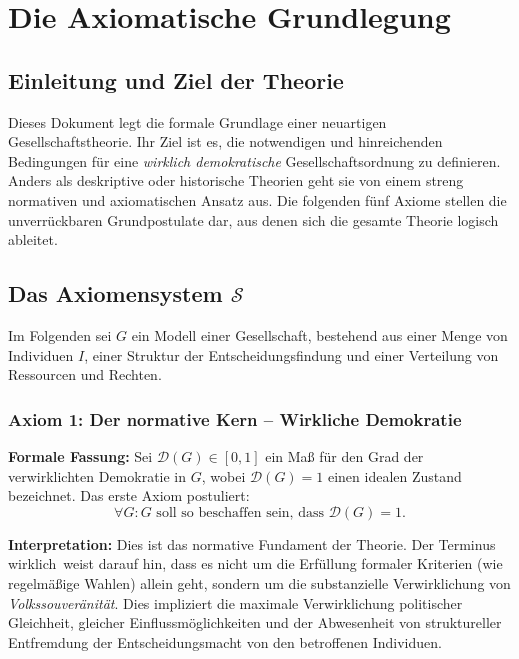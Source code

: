 
\chapter{Die Axiomatische Grundlegung}
\label{chap:axiome}

\section{Einleitung und Ziel der Theorie}
Dieses Dokument legt die formale Grundlage einer neuartigen Gesellschaftstheorie. Ihr Ziel ist es, die notwendigen und hinreichenden Bedingungen für eine \emph{wirklich demokratische} Gesellschaftsordnung zu definieren. Anders als deskriptive oder historische Theorien geht sie von einem streng normativen und axiomatischen Ansatz aus. Die folgenden fünf Axiome stellen die unverrückbaren Grundpostulate dar, aus denen sich die gesamte Theorie logisch ableitet.

\section{Das Axiomensystem $\mathcal{S}$}
Im Folgenden sei $G$ ein Modell einer Gesellschaft, bestehend aus einer Menge von Individuen $I$, einer Struktur der Entscheidungsfindung und einer Verteilung von Ressourcen und Rechten.

\subsection{Axiom 1: Der normative Kern -- Wirkliche Demokratie}
\label{ax:1}

\textbf{Formale Fassung:}
Sei $\mathcal{D}(G) \in [0,1]$ ein Maß für den Grad der verwirklichten Demokratie in $G$, wobei $\mathcal{D}(G)=1$ einen idealen Zustand bezeichnet. Das erste Axiom postuliert:
\[
\boxed{\forall G: G \text{ soll so beschaffen sein, dass } \mathcal{D}(G) = 1.}
\]

\textbf{Interpretation:}
Dies ist das normative Fundament der Theorie. Der Terminus \glqq wirklich\grqq\ weist darauf hin, dass es nicht um die Erfüllung formaler Kriterien (wie regelmäßige Wahlen) allein geht, sondern um die substanzielle Verwirklichung von \emph{Volkssouveränität}. Dies impliziert die maximale Verwirklichung politischer Gleichheit, gleicher Einflussmöglichkeiten und der Abwesenheit von struktureller Entfremdung der Entscheidungsmacht von den betroffenen Individuen.

